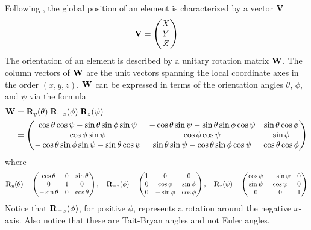 Following \mad, the global position of an element is characterized by a vector ${\bf V}$
\begin{equation}
  {\bf V} = 
  \begin{pmatrix}
    X \\ Y \\ Z 
  \end{pmatrix}
\end{equation}
The orientation of an element is described by a unitary rotation matrix ${\bf W}$. The column vectors
of ${\bf W}$ are the unit vectors spanning the local coordinate axes in the order $(x, y, z)$. ${\bf W}$
can be expressed in terms of the orientation angles $\theta$, $\phi$, and $\psi$ via the formula
\begin{align}
  {\bf W} &= {\bf R}_{y}(\theta) \; {\bf R}_{-x}(\phi) \; {\bf R}_{z}(\psi) 
  \label{wwww} \\
  &= \begin{pmatrix}
    \cos\theta \cos\psi - \sin\theta \sin\phi \sin\psi & -\cos\theta \sin\psi - \sin\theta \sin\phi \cos\psi & 
                                                                                          \sin\theta \cos\phi \\
    \cos\phi \sin\psi & \cos\phi \cos\psi & \sin\phi \\
   -\cos\theta \sin\phi \sin\psi - \sin\theta \cos\psi & \sin\theta \sin\psi - \cos\theta \sin\phi \cos\psi & 
                                                                                          \cos\theta \cos\phi 
  \end{pmatrix}
  \nonumber
\end{align}
where
\begin{equation}
  {\bf R}_{y}(\theta) = 
  \begin{pmatrix}
    \cos\theta  & 0 & \sin\theta \\
    0           & 1 & 0          \\
    -\sin\theta & 0 & \cos\theta 
  \end{pmatrix}, \quad
  {\bf R}_{-x}(\phi) = 
  \begin{pmatrix}
    1 & 0 & 0                \\
    0 & \cos\phi  & \sin\phi \\
    0 & -\sin\phi & \cos\phi 
  \end{pmatrix}, \quad
  {\bf R}_{z}(\psi) = 
  \begin{pmatrix}
    \cos\psi & -\sin\psi & 0 \\
    \sin\psi &  \cos\psi & 0 \\
    0        &  0        & 1                
  \end{pmatrix}
  \label{wtt0t}
\end{equation}
Notice that ${\bf R}_{-x}(\phi)$, for positive $\phi$, represents a rotation around the negative
$x$-axis. Also notice that these are Tait-Bryan angles and not Euler angles.

